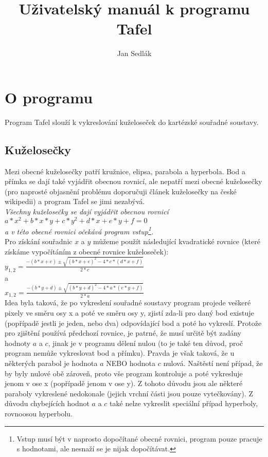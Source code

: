 \documentclass[a4paper,11pt,titlepage]{article}
\author{Jan Sedlák}
\title{Uživatelský manuál k programu Tafel}
\begin{document}
\maketitle
\tableofcontents
\newpage
\section{O programu}
Program Tafel slouží k vykreslování kuželoseček do kartézské souřadné soustavy.
\subsection{Kuželosečky}
Mezi obecné kuželosečky patří kružnice, elipsa, parabola a hyperbola. Bod a přímka se dají také vyjádřit obecnou rovnicí, ale nepatří mezi obecné kuželosečky (pro naprosté objasnění problému doporučuji článek kuželosečky na české wikipedii) a program Tafel se jimi nezabývá.\\

\emph{Všechny kuželosečky se dají vyjádřit obecnou rovnicí}\\

\emph{$a*x^{2}+b*x*y+c*y^{2}+d*x+e*y+f=0$}\\

\emph{a v této obecné rovnici očekává program vstup\footnote{Vstup musí být v naprosto dopočítané obecné rovnici, program pouze pracuje s hodnotami, ale nesnaží se je nijak dopočítávat.}.}\\

Pro získání souřadnic $x$ a $y$ můžeme použít následující kvadratické rovnice (které získáme vypočítáním z obecné rovnice kuželoseček):\\

\emph{$y_{1,2}=\frac{-(b*x+e)\pm \sqrt{(b*x+e)^{2}-4*c*(d*x+f)}}{2*c}$}\\

a\\

\emph{$x_{1,2}=\frac{-(b*y+d)\pm \sqrt{(b*y+d)^{2}-4*a*(e*y+f)}}{2*a}$}\\

Idea byla taková, že po vykreslení souřadné soustavy program projede veškeré pixely ve směru osy x a poté ve směru osy y, zjistí zda-li pro daný bod existuje (popřípadě jestli je jeden, nebo dva) odpovídající bod a poté ho vykreslí. Protože pro zjištění používá předchozí rovnice, je patrné, že musí určitě být zadány hodnoty $a$ a $c$, jinak je v programu dělení nulou (to je také ten důvod, proč program nemůže vykreslovat bod a přímku). Pravda je však taková, že u některých parabol je hodnota $a$ NEBO hodnota $c$ nulová. Naštěstí není případ, že by byly nulové obě zároveň, proto vše program kontroluje a poté vykresluje jenom v ose x (popřípadě jenom v ose y). Z tohoto důvodu jsou ale některé paraboly vykreslené nedokonale (jejich vrchní části jsou pouze vytečkovány). Z důvodu chybejících hodnot $a$ a $c$ také nelze vykreslit speciální případ hyperboly, rovnoosou hyperbolu.
\newpage
\end{document}
